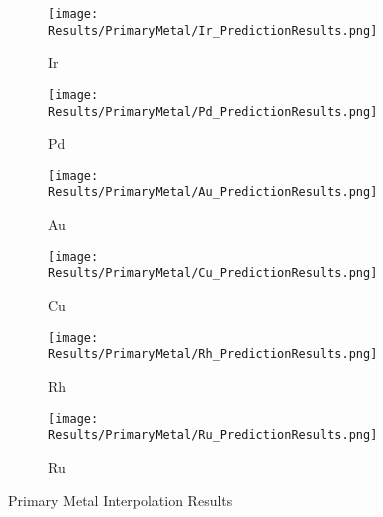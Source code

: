 	\begin{figure}[!htbp]
	    \centering
	    \begin{subfigure}[b]{0.35\textwidth}
	        \centering
	        \texttt{[image: Results/PrimaryMetal/Ir\_PredictionResults.png]}
	        \caption{Ir}
	        \label{fig:non-norm_dist, Ir}
	    \end{subfigure}
	    \begin{subfigure}[b]{0.35\textwidth}
	        \centering
	        \texttt{[image: Results/PrimaryMetal/Pd\_PredictionResults.png]}
	        \caption{Pd}
	        \label{fig:norm_dist, Pd}
	    \end{subfigure}
	    \begin{subfigure}[b]{0.35\textwidth}
	        \centering
	        \texttt{[image: Results/PrimaryMetal/Au\_PredictionResults.png]}
	        \caption{Au}
	        \label{fig:norm_dist, Au}
	    \end{subfigure}
	    \begin{subfigure}[b]{0.35\textwidth}
	        \centering
	        \texttt{[image: Results/PrimaryMetal/Cu\_PredictionResults.png]}
	        \caption{Cu}
	        \label{fig:norm_dist, Cu}
	    \end{subfigure}
	    \begin{subfigure}[b]{0.35\textwidth}
	        \centering
	        \texttt{[image: Results/PrimaryMetal/Rh\_PredictionResults.png]}
	        \caption{Rh}
	        \label{fig:norm_dist, Rh}
	    \end{subfigure}
	    \begin{subfigure}[b]{0.35\textwidth}
	        \centering
	        \texttt{[image: Results/PrimaryMetal/Ru\_PredictionResults.png]}
	        \caption{Ru}
	        \label{fig:norm_dist, Ru}
	    \end{subfigure}
	    \caption{Primary Metal Interpolation Results}
	    \label{fig:primary metal exclusion}
	\end{figure}
	\FloatBarrier


